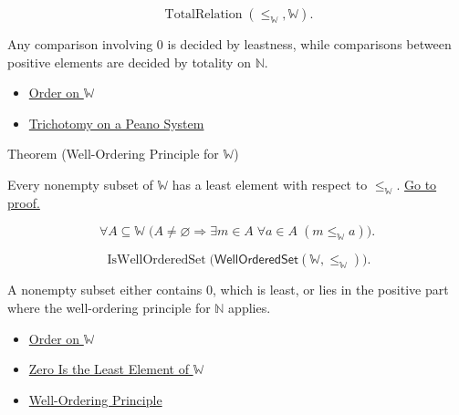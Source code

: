 \begin{remark*}
\[
\operatorname{TotalRelation}(\leq_{\mathbb{W}},\mathbb{W}).
\]
\end{remark*}

\begin{remark*}[Interpretation]
Any comparison involving $0$ is decided by leastness, while comparisons
between positive elements are decided by totality on $\mathbb{N}$.
\end{remark*}

\begin{dependencies}
\begin{itemize}
  \item \hyperref[def:order-on-w]{Order on $\mathbb{W}$}
  \item \hyperref[thm:trichotomy-on-peano-system]{Trichotomy on a Peano System}
\end{itemize}
\end{dependencies}

\begin{theorembox}{Theorem (Well-Ordering Principle for \texorpdfstring{$\mathbb{W}$}{W})}
\begin{theorem}
\label{thm:well-ordering-principle-for-w}
Every nonempty subset of $\mathbb{W}$ has a least element with respect to
$\leq_{\mathbb{W}}$.
\hyperref[prf:well-ordering-principle-for-w]{Go to proof.}
\end{theorem}
\end{theorembox}

\begin{remark*}
\[
\forall A\subseteq\mathbb{W}\;
\bigl(A\neq\varnothing \Longrightarrow
\exists m\in A\;\forall a\in A\;(m\leq_{\mathbb{W}}a)\bigr).
\]
\end{remark*}

\begin{remark*}
\[
\operatorname{IsWellOrderedSet}
\bigl(\mathsf{WellOrderedSet}(\mathbb{W},\leq_{\mathbb{W}})\bigr).
\]
\end{remark*}

\begin{remark*}[Interpretation]
A nonempty subset either contains $0$, which is least, or lies in the positive
part where the well-ordering principle for $\mathbb{N}$ applies.
\end{remark*}

\begin{dependencies}
\begin{itemize}
  \item \hyperref[def:order-on-w]{Order on $\mathbb{W}$}
  \item \hyperref[thm:zero-least-element-of-w]{Zero Is the Least Element of $\mathbb{W}$}
  \item \hyperref[thm:well-ordering-principle]{Well-Ordering Principle}
\end{itemize}
\end{dependencies}
